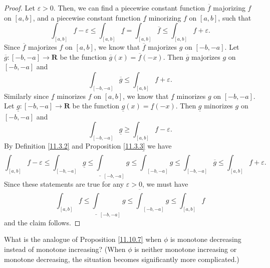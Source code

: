 \begin{proof}
    Let \(\varepsilon > 0\).
    Then, we can find a piecewise constant function \(\overline{f}\) majorizing \(f\) on \([a, b]\), and a piecewise constant function \(\underline{f}\) minorizing \(f\) on \([a, b]\), such that
    \[
        \int_{[a, b]} f - \varepsilon \leq \int_{[a, b]} \underline{f} = \int_{[a, b]} \overline{f} \leq \int_{[a, b]} f + \varepsilon.
    \]
    Since \(\overline{f}\) majorizes \(f\) on \([a, b]\), we know that \(\overline{f}\) majorizes \(g\) on \([-b, -a]\).
    Let \(\overline{g} : [-b, -a] \to \mathbf{R}\) be the function \(\overline{g}(x) = \overline{f}(-x)\).
    Then \(\overline{g}\) majorizes \(g\) on \([-b, -a]\) and
    \[
        \int_{[-b, -a]} \overline{g} \leq \int_{[a, b]} f + \varepsilon.
    \]
    Similarly since \(\underline{f}\) minorizes \(f\) on \([a, b]\), we know that \(\underline{f}\) minorizes \(g\) on \([-b, -a]\).
    Let \(\underline{g} : [-b, -a] \to \mathbf{R}\) be the function \(\underline{g}(x) = \underline{f}(-x)\).
    Then \(\underline{g}\) minorizes \(g\) on \([-b, -a]\) and
    \[
        \int_{[-b, -a]} \underline{g} \geq \int_{[a, b]} f - \varepsilon.
    \]
    By Definition \ref{11.3.2} and Proposition \ref{11.3.3} we have
    \[
        \int_{[a, b]} f - \varepsilon \leq \int_{[-b, -a]} \underline{g} \leq \underline{\int}_{[-b, -a]} g \leq \overline{\int}_{[-b, -a]} g \leq \int_{[-b, -a]} \overline{g} \leq \int_{[a, b]} f + \varepsilon.
    \]
    Since these statements are true for any \(\varepsilon > 0\), we must have
    \[
        \int_{[a, b]} f \leq \underline{\int}_{[-b, -a]} g \leq \overline{\int}_{[-b, -a]} g \leq \int_{[a, b]} f
    \]
    and the claim follows.
\end{proof}

\begin{exercise}\label{ex 11.10.4}
    What is the analogue of Proposition \ref{11.10.7} when \(\phi\) is monotone decreasing instead of monotone increasing?
    (When \(\phi\) is neither monotone increasing or monotone decreasing, the situation becomes significantly more complicated.)
\end{exercise}